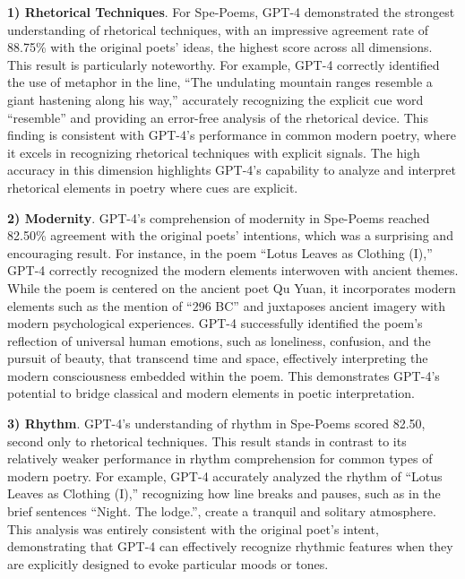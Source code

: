 \documentclass[11pt]{article}
\begin{document}
\textbf{1) Rhetorical Techniques}. For Spe-Poems, GPT-4 demonstrated the strongest understanding of rhetorical techniques, with an impressive agreement rate of 88.75\% with the original poets' ideas, the highest score across all dimensions. This result is particularly noteworthy. For example, GPT-4 correctly identified the use of metaphor in the line, ``The undulating mountain ranges resemble a giant hastening along his way,'' accurately recognizing the explicit cue word ``resemble'' and providing an error-free analysis of the rhetorical device. This finding is consistent with GPT-4's performance in common modern poetry, where it excels in recognizing rhetorical techniques with explicit signals. The high accuracy in this dimension highlights GPT-4's capability to analyze and interpret rhetorical elements in poetry where cues are explicit.

\textbf{2) Modernity}. GPT-4's comprehension of modernity in Spe-Poems reached 82.50\% agreement with the original poets' intentions, which was a surprising and encouraging result. For instance, in the poem ``Lotus Leaves as Clothing (I),'' GPT-4 correctly recognized the modern elements interwoven with ancient themes. While the poem is centered on the ancient poet Qu Yuan, it incorporates modern elements such as the mention of ``296 BC'' and juxtaposes ancient imagery with modern psychological experiences. GPT-4 successfully identified the poem's reflection of universal human emotions, such as loneliness, confusion, and the pursuit of beauty, that transcend time and space, effectively interpreting the modern consciousness embedded within the poem. This demonstrates GPT-4's potential to bridge classical and modern elements in poetic interpretation.

\textbf{3) Rhythm}. GPT-4's understanding of rhythm in Spe-Poems scored 82.50, second only to rhetorical techniques. This result stands in contrast to its relatively weaker performance in rhythm comprehension for common types of modern poetry. For example, GPT-4 accurately analyzed the rhythm of ``Lotus Leaves as Clothing (I),'' recognizing how line breaks and pauses, such as in the brief sentences ``Night. The lodge.'', create a tranquil and solitary atmosphere. This analysis was entirely consistent with the original poet's intent, demonstrating that GPT-4 can effectively recognize rhythmic features when they are explicitly designed to evoke particular moods or tones.
\end{document}
